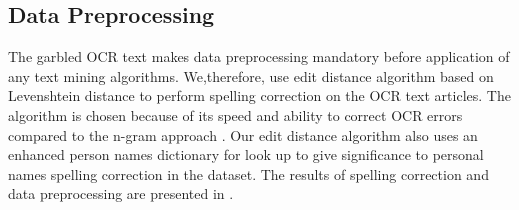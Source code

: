 \subsection{Data Preprocessing}
The garbled OCR text makes data preprocessing mandatory before application of any text mining algorithms. We,therefore, use edit distance algorithm based on Levenshtein distance to perform spelling correction on the OCR text articles. The algorithm is chosen because of its speed and ability to correct OCR errors compared to the n-gram approach \cite{chattopadhyaya2013fast}. Our edit distance algorithm also uses an enhanced person names dictionary for look up to give significance to personal names spelling correction in the dataset. The results of spelling correction and data preprocessing are presented in \cite{gupta2014finding}.
